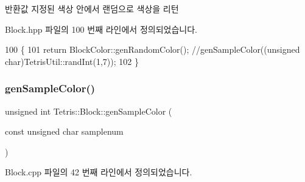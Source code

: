\begin{DoxyReturn}{반환값}
지정된 색상 안에서 랜덤으로 색상을 리턴 
\end{DoxyReturn}


Block.\+hpp 파일의 100 번째 라인에서 정의되었습니다.


\begin{DoxyCode}
100                                          \{
101                 \textcolor{keywordflow}{return} BlockColor::genRandomColor(); \textcolor{comment}{//genSampleColor((unsigned
       char)TetrisUtil::randInt(1,7));}
102             \}
\end{DoxyCode}
\mbox{\label{class_tetris_1_1_block_a9cac65704d2c788488ecf65d5b0467bd}} 
\subsubsection{\texorpdfstring{gen\+Sample\+Color()}{genSampleColor()}}
{\footnotesize\ttfamily unsigned int Tetris\+::\+Block\+::gen\+Sample\+Color (\begin{DoxyParamCaption}\item[{const unsigned char}]{samplenum }\end{DoxyParamCaption})}



Block.\+cpp 파일의 42 번째 라인에서 정의되었습니다.


